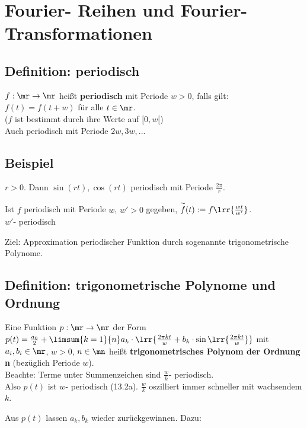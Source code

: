 \chapter{Fourier- Reihen und Fourier- Transformationen}

\section{Definition: periodisch}
	$ f:\mr\rightarrow\mr $ heißt \textbf{periodisch} mit Periode $ w>0 $, falls gilt:\\
	$ f(t)=f(t+w) $ für alle $ t\in\mr $.\\
	($ f $ ist bestimmt durch ihre Werte auf $ [0,w[ $)\\
	Auch periodisch mit Periode $ 2w,3w,... $

\section{Beispiel}
	\item $ r>0 $. Dann $ \sin(rt),\cos(rt) $ periodisch mit Periode $ \frac{2\pi}{r} $.
	\item Ist $ f $ periodisch mit Periode $ w $, $ w'>0 $ gegeben, $ \overset{\sim}{f}(t):=f\lrr{\frac{wt}{w'}} $.\\
	$ w' $- periodisch
	\subExEnd
	
	Ziel: Approximation periodischer Funktion durch sogenannte trigonometrische Polynome.
	
\section{Definition: trigonometrische Polynome und Ordnung}
	Eine Funktion $ p:\mr\rightarrow\mr $ der Form $ p(t)=\frac{a_0}{2}+\limsum{k=1}{n}a_k\cdot\lrr{\frac{2\pi kt}{w}+b_k\cdot\sin\lrr{\frac{2\pi kt}{w}}} $ mit $ a_i,b_i\in\mr $, $ w>0 $, $ n\in\mn $ heißt \textbf{trigonometrisches Polynom der Ordnung n} (bezüglich Periode $ w $).\\
	Beachte: Terme unter Summenzeichen sind $ \frac{w}{k} $- periodisch.\\
	Also $ p(t) $ ist $ w $- periodisch (13.2a).
	$ \frac{w}{k} $ oszilliert immer schneller mit wachsendem $ k $.
	
	Aus $ p(t) $ lassen $ a_k,b_k $ wieder zurückgewinnen. Dazu:

